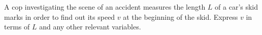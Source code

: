  A cop investigating the scene of an accident measures
the length $L$ of a car's skid marks in order to find out
its speed $v$ at the beginning of the skid. Express $v$ in
terms of $L$ and any other relevant variables.\answercheck
